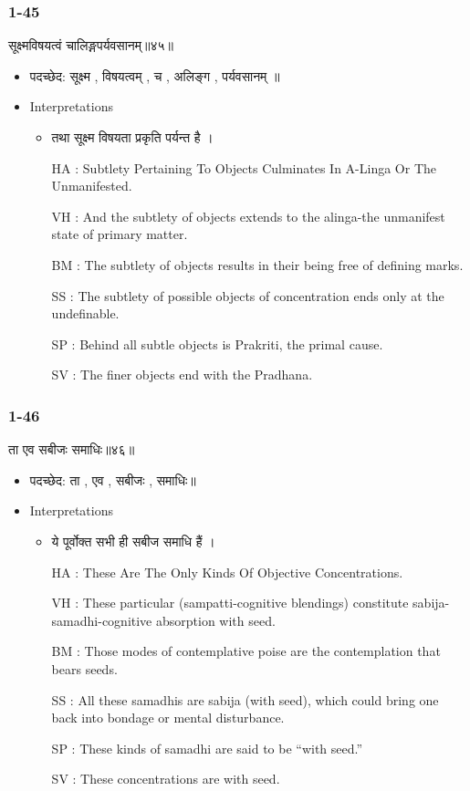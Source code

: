 \begin{frame}[fragile]\frametitle{1-45}
\begin{sanskrit}
सूक्ष्मविषयत्वं चालिङ्गपर्यवसानम्॥४५॥
\end{sanskrit}

	\begin{itemize}
	\item पदच्छेद: सूक्ष्म , विषयत्वम् , च , अलिङ्ग , पर्यवसानम् ॥
	\item Interpretations
		\begin{itemize}
		\item तथा सूक्ष्म विषयता प्रकृति पर्यन्त है ।
		\item [HA]: Subtlety Pertaining To Objects Culminates In A-Linga Or The Unmanifested.
		\item [VH]: And the subtlety of objects extends to the alinga-the unmanifest state of primary matter.
		\item [BM]: The subtlety of objects results in their being free of defining marks.
		\item [SS]: The subtlety of possible objects of concentration ends only at the undefinable.
		\item [SP]: Behind all subtle objects is Prakriti, the primal cause.
		\item [SV]: The finer objects end with the Pradhana. 
		\end{itemize}
	\end{itemize}
	
\end{frame}

\begin{frame}[fragile]\frametitle{1-46}
\begin{sanskrit}
ता एव सबीजः समाधिः॥४६॥
\end{sanskrit}

	\begin{itemize}
	\item पदच्छेद: ता , एव , सबीजः , समाधिः॥
	\item Interpretations
		\begin{itemize}
		\item ये पूर्वोक्त सभी ही सबीज समाधि हैं ।
		\item [HA]: These Are The Only Kinds Of Objective Concentrations.
		\item [VH]: These particular (sampatti-cognitive blendings) constitute sabija-samadhi-cognitive absorption with seed.
		\item [BM]: Those modes of contemplative poise are the contemplation that bears seeds.
		\item [SS]: All these samadhis are sabija (with seed), which could bring one back into bondage or mental disturbance.
		\item [SP]: These kinds of samadhi are said to be “with seed.”
		\item [SV]: These concentrations are with seed. 
		\end{itemize}
	\end{itemize}
	
\end{frame}


